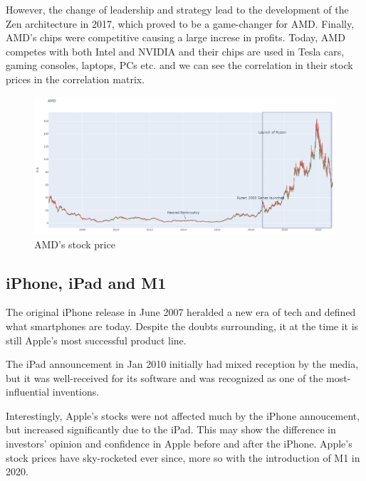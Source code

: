 \documentclass[11pt, twocolumn]{article}
\begin{document}
\begin{justify}
However, the change of leadership and strategy lead to the development of the Zen architecture in 2017, which proved to be a game-changer for AMD. Finally, AMD's chips were competitive causing a large increse in profits. Today, AMD competes with both Intel and NVIDIA and their chips are used in Tesla cars, gaming consoles, laptops, PCs etc. and we can see the correlation in their stock prices in the correlation matrix.
\vspace{-5pt}

\begin{figure}[h]
  \centering
  \includegraphics[scale=0.24]{figs/amd.jpg}
  \caption*{AMD's stock price}
\end{figure}

\subsection{iPhone, iPad and M1}
The original iPhone release in June 2007 heralded a new era of tech and defined what smartphones are today. Despite the
doubts surrounding, it at the time it is still Apple's most successful product line.
\vspace{1em}


The iPad announcement in Jan 2010 initially had mixed reception by the media, but it was well-received for its software and was recognized as one of the most-influential inventions.
\vspace{1em}


Interestingly, Apple's stocks were not affected much by the iPhone annoucement, but increased significantly due to the iPad. This may show the difference in investors' opinion and
confidence in Apple before and after the iPhone. Apple's stock prices have sky-rocketed ever since, more so with the introduction of M1 in 2020.
\vspace{-5pt}


\end{justify}
\end{document}

